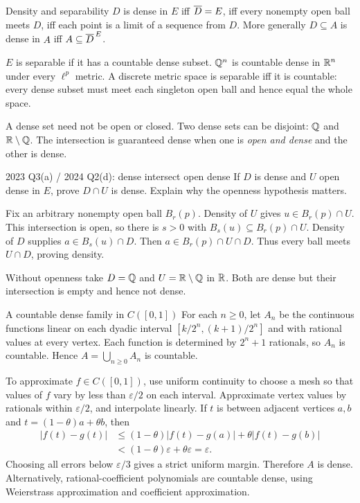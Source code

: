 \begin{note}{Density and separability}
$D$ is dense in $E$ iff $\overline{D}=E$, iff every nonempty open ball meets $D$, iff each point is a limit of a sequence from $D$. More generally $D\subseteq A$ is dense in $A$ iff $A\subseteq\overline{D}^{\,E}$.

$E$ is separable if it has a countable dense subset. $\mathbb Q^n$ is countable dense in $\mathbb R^n$ under every $\ell^p$ metric. A discrete metric space is separable iff it is countable: every dense subset must meet each singleton open ball and hence equal the whole space.

A dense set need not be open or closed. Two dense sets can be disjoint: $\mathbb Q$ and $\mathbb R\setminus\mathbb Q$. The intersection is guaranteed dense when one is \emph{open and dense} and the other is dense.
\end{note}
\begin{exam}{2023 Q3(a) / 2024 Q2(d): dense intersect open dense}
If $D$ is dense and $U$ open dense in $E$, prove $D\cap U$ is dense. Explain why the openness hypothesis matters.
\end{exam}
\begin{answer}
Fix an arbitrary nonempty open ball $B_r(p)$. Density of $U$ gives $u\in B_r(p)\cap U$. This intersection is open, so there is $s>0$ with $B_s(u)\subseteq B_r(p)\cap U$. Density of $D$ supplies $a\in B_s(u)\cap D$. Then $a\in B_r(p)\cap U\cap D$. Thus every ball meets $U\cap D$, proving density.

Without openness take $D=\mathbb Q$ and $U=\mathbb R\setminus\mathbb Q$ in $\mathbb R$. Both are dense but their intersection is empty and hence not dense.
\end{answer}
\begin{note}{A countable dense family in $C([0,1])$}
For each $n\ge0$, let $A_n$ be the continuous functions linear on each dyadic interval $[k/2^n,(k+1)/2^n]$ and with rational values at every vertex. Each function is determined by $2^n+1$ rationals, so $A_n$ is countable. Hence $A=\bigcup_{n\ge0}A_n$ is countable.

To approximate $f\in C([0,1])$, use uniform continuity to choose a mesh so that values of $f$ vary by less than $\varepsilon/2$ on each interval. Approximate vertex values by rationals within $\varepsilon/2$, and interpolate linearly. If $t$ is between adjacent vertices $a,b$ and $t=(1-\theta)a+\theta b$, then
\begin{align*}
|f(t)-g(t)|&\le(1-\theta)|f(t)-g(a)|+\theta|f(t)-g(b)|\\
&< (1-\theta)\varepsilon+\theta\varepsilon=\varepsilon.
\end{align*}
Choosing all errors below $\varepsilon/3$ gives a strict uniform margin. Therefore $A$ is dense. Alternatively, rational-coefficient polynomials are countable dense, using Weierstrass approximation and coefficient approximation.
\end{note}
